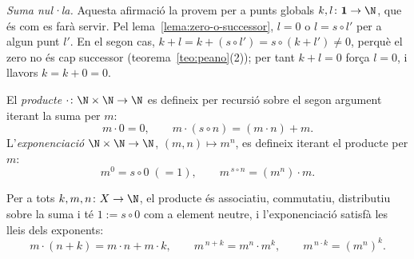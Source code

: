 \begin{prova}
\emph{Suma nul·la.} Aquesta afirmació la provem per a punts globals
\(k,l\colon\mathbf1\to\N\), que és com es farà servir. Pel
lema~\ref{lema:zero-o-successor}, \(l=0\) o \(l=s\circ l'\) per a algun
punt \(l'\). En el segon cas,
\(k+l=k+(s\circ l')=s\circ(k+l')\ne0\), perquè el zero no és cap successor
(teorema~\ref{teo:peano}(2)); per tant \(k+l=0\) força \(l=0\), i llavors
\(k=k+0=0\).
\end{prova}

\begin{definicio}\label{def:producte-exp}
El \emph{producte} \(\cdot\colon\N\times\N\to\N\) es defineix per recursió
sobre el segon argument iterant la suma per \(m\):
\[
m\cdot 0=0,
\qquad
m\cdot(s\circ n)=(m\cdot n)+m .
\]
L'\emph{exponenciació} \(\N\times\N\to\N\), \((m,n)\mapsto m^{n}\), es
defineix iterant el producte per \(m\):
\[
m^{0}=s\circ 0\;(=1),
\qquad
m^{\,s\circ n}=(m^{n})\cdot m .
\]
\end{definicio}

\begin{proposicio}\label{prop:lleis-aritmetica}
Per a tots \(k,m,n\colon X\to\N\), el producte és associatiu, commutatiu,
distributiu sobre la suma i té \(1:=s\circ 0\) com a element neutre, i
l'exponenciació satisfà les lleis dels exponents:
\[
m\cdot(n+k)=m\cdot n+m\cdot k,
\qquad
m^{\,n+k}=m^{n}\cdot m^{k},
\qquad
m^{\,n\cdot k}=(m^{n})^{k}.
\]
\end{proposicio}

